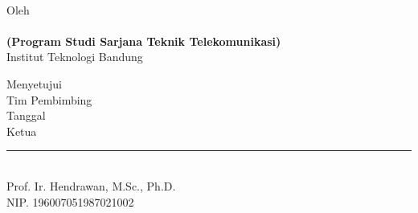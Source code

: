 \clearpage
\pagestyle{empty}

\begin{center}
	\renewcommand{\baselinestretch}{1}
    \large{\bfseries \MakeUppercase{\thetitle}}
    \\[2\baselineskip]
	
    \normalsize{Oleh\\
    \textbf{\theauthor}\\
    \textbf{(Program Studi Sarjana Teknik Telekomunikasi)}
    \\[\baselineskip]
    Institut Teknologi Bandung}
    \\[3\baselineskip]

    \normalsize{Menyetujui\\
    Tim Pembimbing
    \\[\baselineskip]
    
    Tanggal \thedate\\[2\baselineskip]
    Ketua\\[4\baselineskip]
    \rule{5cm}{0.4pt} \\
    Prof. Ir. Hendrawan, M.Sc., Ph.D.\\
    NIP. 196007051987021002}

\end{center}
\clearpage
